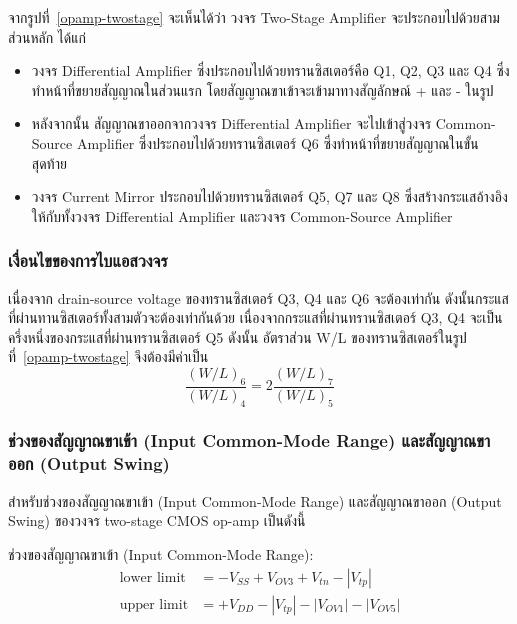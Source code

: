 \documentclass[a4paper, 11pt, oneside]{book} %
\begin{document}
จากรูปที่~\ref{opamp-twostage} จะเห็นได้ว่า วงจร Two-Stage Amplifier จะประกอบไปด้วยสามส่วนหลัก ได้แก่ 

\begin{itemize}
    \item วงจร Differential Amplifier ซึ่งประกอบไปด้วยทรานซิสเตอร์คือ Q1, Q2, Q3 และ Q4 ซึ่งทำหน้าที่ขยายสัญญาณในส่วนแรก โดยสัญญาณขาเข้าจะเข้ามาทางสัญลักษณ์ + และ - ในรูป
    \item หลังจากนั้น สัญญาณขาออกจากวงจร Differential Amplifier จะไปเข้าสู่วงจร Common-Source Amplifier ซึ่งประกอบไปด้วยทรานซิสเตอร์ Q6 ซึ่งทำหน้าที่ขยายสัญญาณในขั้นสุดท้าย
    \item วงจร Current Mirror ประกอบไปด้วยทรานซิสเตอร์ Q5, Q7 และ Q8 ซึ่งสร้างกระแสอ้างอิงให้กับทั้งวงจร Differential Amplifier และวงจร Common-Source Amplifier 
\end{itemize}

\subsubsection{เงื่อนไขของการไบแอสวงจร}

เนื่องจาก drain-source voltage ของทรานซิสเตอร์ Q3, Q4 และ Q6 จะต้องเท่ากัน ดังนั้นกระแสที่ผ่านทานซิสเตอร์ทั้งสามตัวจะต้องเท่ากันด้วย เนื่องจากกระแสที่ผ่านทรานซิสเตอร์ Q3, Q4 จะเป็นครึ่งหนึ่งของกระแสที่ผ่านทรานซิสเตอร์ Q5 ดังนั้น อัตราส่วน W/L ของทรานซิสเตอร์ในรูปที่~\ref{opamp-twostage} จึงต้องมีค่าเป็น
\begin{equation}
    \frac{(W/L)_6}{(W/L)_4} = 2\frac{(W/L)_7}{(W/L)_5}
    \label{offset-eq}
\end{equation}

\subsubsection{ช่วงของสัญญาณขาเข้า (Input Common-Mode Range) และสัญญาณขาออก  (Output Swing)}

สำหรับช่วงของสัญญาณขาเข้า (Input Common-Mode Range) และสัญญาณขาออก  (Output Swing) ของวงจร two-stage CMOS op-amp เป็นดังนี้

ช่วงของสัญญาณขาเข้า (Input Common-Mode Range):
\begin{subequations}
    \label{input-range}
    \begin{align}
        \textrm{lower limit} &= -V_{SS} + V_{OV3} + V_{tn} - |V_{tp}| \\
        \textrm{upper limit} &= +V_{DD} - |V_{tp}| - |V_{OV1}| - |V_{OV5}|
    \end{align}
\end{subequations}
\end{document}
